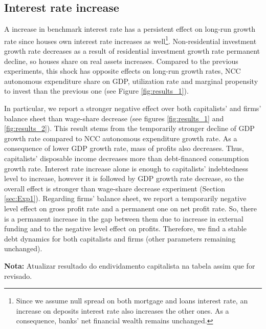 \documentclass[11pt]{article}
\begin{document}
\subsection{Interest rate increase}
\label{sec:orga5d2926}
\label{sec:Exp3}

A increase in benchmark interest rate  has a persistent effect on long-run growth rate since houses own interest rate increases as well\footnote{Since we assume null spread on both mortgage and loans interest rate, an increase on deposits interest rate also increases the other ones. As a consequence, banks' net financial wealth remains unchanged.}.
Non-residential investment growth rate decreases as a result of residential investment growth rate permanent decline, so houses share on real assets increases.
Compared to the previous experiments, this shock has opposite effects on long-run growth rates, NCC autonomous expenditure share on GDP, utilization rate and marginal propensity to invest  than the previous one (see Figure \ref{fig:results_1}).


In particular, we report a stronger negative effect over both capitalists' and firms' balance sheet than wage-share decrease (see figures \ref{fig:results_1} and \ref{fig:results_2}).
This result stems from the temporarily stronger decline of GDP growth rate compared to NCC autonomous expenditure growth rate.
As a consequence of lower GDP growth rate, mass of profits also decreases.
Thus, capitalists' disposable income decreases more than debt-financed consumption growth rate.
Interest rate increase alone is enough to capitalists' indebtedness level to increase, however it is followed by GDP growth rate decrease, so the overall effect is stronger than wage-share decrease experiment (Section \ref{sec:Exp1}).
Regarding firms' balance sheet, we report a temporarily negative level effect on gross profit rate and a permanent one on net profit rate. 
So, there is a permanent increase in the gap between them due to increase in external funding and to the negative level effect on profits.
Therefore, we find a stable debt dynamics for both capitalists and firms (other parameters remaining unchanged).

\textbf{Nota:} Atualizar resultado do endividamento capitalista na tabela assim que for revisado.
\end{document}
